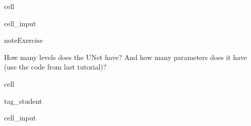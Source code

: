 \documentclass[letterpaper,10pt,english]{jupyterBook}
\begin{document}
\begin{sphinxuseclass}{cell}\begin{sphinxVerbatimInput}

\begin{sphinxuseclass}{cell_input}
\begin{sphinxVerbatim}[commandchars=\\\{\}]
  
        
       
\end{sphinxVerbatim}

\end{sphinxuseclass}\end{sphinxVerbatimInput}

\end{sphinxuseclass}
\begin{sphinxadmonition}{note}{Exercise}

\sphinxAtStartPar
How many levels does the U\sphinxhyphen{}Net have? And how many parameters does it have (use the code from last tutorial)?
\end{sphinxadmonition}

\begin{sphinxuseclass}{cell}
\begin{sphinxuseclass}{tag_student}\begin{sphinxVerbatimInput}

\begin{sphinxuseclass}{cell_input}
\begin{sphinxVerbatim}[commandchars=\\\{\}]
\end{sphinxVerbatim}

\end{sphinxuseclass}\end{sphinxVerbatimInput}

\end{sphinxuseclass}
\end{sphinxuseclass}
\end{document}
